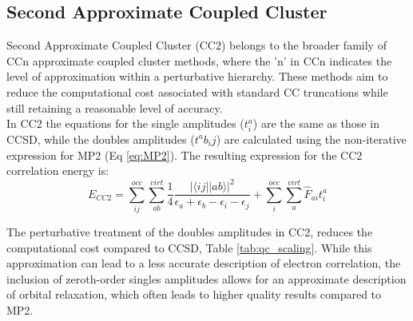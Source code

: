 \subsection{Second Approximate Coupled Cluster}\label{sec:CC2Theory}
Second Approximate Coupled Cluster (CC2) belongs to the broader family of CCn approximate coupled cluster methods, where the 'n' in CCn indicates the level of approximation within a perturbative hierarchy. These methods aim to reduce the computational cost associated with standard CC truncations while still retaining a reasonable level of accuracy.\\

In CC2 the equations for the single amplitudes ($t^a_i$) are the same as those in CCSD, while the doubles amplitudes ($t^ab_ij$) are calculated using the non-iterative expression for MP2 (Eq \ref{eq:MP2}). The resulting expression for the CC2 correlation energy is:
\begin{equation}\label{CC2Energy}
    E_{CC2} = \sum_{ij}^{occ} \sum_{ab}^{virt} \frac{1}{4}\frac{|\langle i j || a b \rangle|^2}{\epsilon_a + \epsilon_b - \epsilon_i - \epsilon_j}  + \sum_{i}^{occ} \sum_{a}^{virt} \hat{F}_{ai} t^a_i 
\end{equation}

The perturbative treatment of the doubles amplitudes in CC2, reduces the computational cost compared to CCSD, Table \ref{tab:qc_scaling}. While this approximation can lead to a less accurate description of electron correlation, the inclusion of zeroth-order singles amplitudes allows for an approximate description of orbital relaxation, which often leads to higher quality results compared to MP2.

